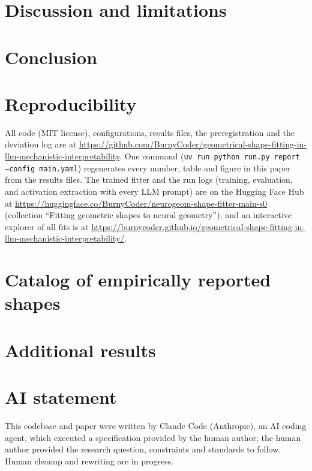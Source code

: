 \documentclass[10pt]{article}
\begin{document}
\section{Discussion and limitations}


\section{Conclusion}


\section*{Reproducibility}
All code (MIT license), configurations, results files, the preregistration and the deviation log are at \url{https://github.com/BurnyCoder/geometrical-shape-fitting-in-llm-mechanistic-interpretability}. One command (\texttt{uv run python run.py report --config main.yaml}) regenerates every number, table and figure in this paper from the results files. The trained fitter and the run logs (training, evaluation, and activation extraction with every LLM prompt) are on the Hugging Face Hub at \url{https://huggingface.co/BurnyCoder/neurogeom-shape-fitter-main-s0} (collection ``Fitting geometric shapes to neural geometry''), and an interactive explorer of all fits is at \url{https://burnycoder.github.io/geometrical-shape-fitting-in-llm-mechanistic-interpretability/}.




\appendix
\section{Catalog of empirically reported shapes}
\label{app:catalog}

\section{Additional results}


\section*{AI statement}
This codebase and paper were written by Claude Code (Anthropic), an AI coding agent, which executed a specification provided by the human author; the human author provided the research question, constraints and standards to follow. Human cleanup and rewriting are in progress.
\end{document}
